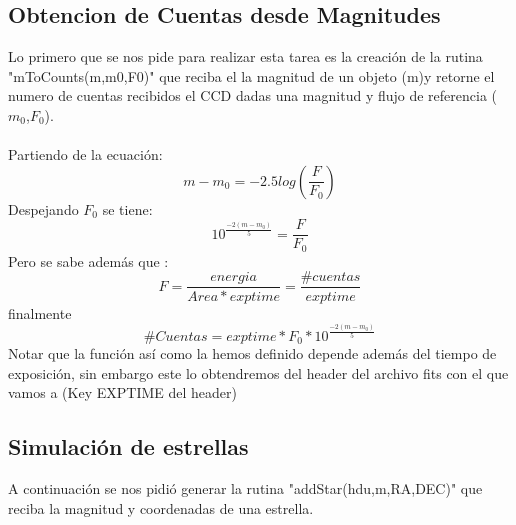 \documentclass[twocolumn]{AS4201}
\begin{document}
\subsection{Obtencion de Cuentas desde Magnitudes}
\label{cuentas}
Lo primero que se nos pide para realizar esta tarea es la creación de la rutina "mToCounts(m,m0,F0)" que reciba el la magnitud de un objeto (m)y retorne el numero de cuentas recibidos el CCD dadas una magnitud y flujo de referencia ($m_0$,$F_0$).\\
\\
Partiendo de la ecuación:
\begin{equation}
	m-m_0=-2.5log(\frac{F}{F_0})
\end{equation}
Despejando $F_0$ se tiene:
\begin{equation}
	10^{\frac{-2(m-m_0)}{5}}=\frac{F}{F_0}
\end{equation}
Pero se sabe además que :
\begin{equation}
	F=\frac{energia}{Area*exptime}=\frac{\# cuentas}{exptime}
\end{equation}
finalmente 
\begin{equation}
	\# Cuentas=exptime*F_0*10^{\frac{-2(m-m_0)}{5}}
\end{equation}
Notar que la función así como la hemos definido depende además del tiempo de exposición, sin embargo este lo obtendremos del header del archivo fits con el que vamos a (Key EXPTIME del header)  
\subsection{Simulación de estrellas}
A continuación se nos pidió generar la rutina "addStar(hdu,m,RA,DEC)" que reciba la magnitud y coordenadas de una estrella.\\ 	
\end{document}
